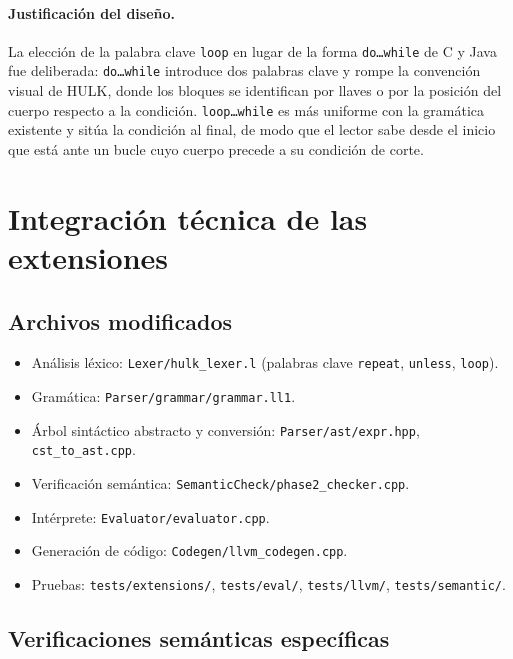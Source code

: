 \documentclass[11pt,a4paper]{article}
\begin{document}
\paragraph{Justificación del diseño.} La elección de la palabra clave \texttt{loop} en lugar de la forma \texttt{do\ldots while} de C y Java fue deliberada: \texttt{do\ldots while} introduce dos palabras clave y rompe la convención visual de HULK, donde los bloques se identifican por llaves o por la posición del cuerpo respecto a la condición. \texttt{loop\ldots while} es más uniforme con la gramática existente y sitúa la condición al final, de modo que el lector sabe desde el inicio que está ante un bucle cuyo cuerpo precede a su condición de corte.

\section{Integración técnica de las extensiones}

\subsection{Archivos modificados}

\begin{itemize}
  \item Análisis léxico: \texttt{Lexer/hulk\_lexer.l} (palabras clave \texttt{repeat}, \texttt{unless}, \texttt{loop}).
  \item Gramática: \texttt{Parser/grammar/grammar.ll1}.
  \item Árbol sintáctico abstracto y conversión: \texttt{Parser/ast/expr.hpp}, \texttt{cst\_to\_ast.cpp}.
  \item Verificación semántica: \texttt{SemanticCheck/phase2\_checker.cpp}.
  \item Intérprete: \texttt{Evaluator/evaluator.cpp}.
  \item Generación de código: \texttt{Codegen/llvm\_codegen.cpp}.
  \item Pruebas: \texttt{tests/extensions/}, \texttt{tests/eval/}, \texttt{tests/llvm/}, \texttt{tests/semantic/}.
\end{itemize}

\subsection{Verificaciones semánticas específicas}
\end{document}
